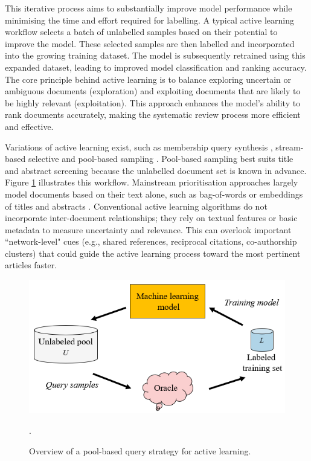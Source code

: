 \documentclass[10pt,oneside]{book}
\begin{document}
This iterative process aims to substantially improve model performance while minimising the time and effort required for labelling. A typical active learning workflow selects a batch of unlabelled samples based on their potential to improve the model. These selected samples are then labelled and incorporated into the growing training dataset. The model is subsequently retrained using this expanded dataset, leading to improved model classification and ranking accuracy. The core principle behind active learning is to balance exploring uncertain or ambiguous documents (exploration) and exploiting documents that are likely to be highly relevant (exploitation). This approach enhances the model's ability to rank documents accurately, making the systematic review process more efficient and effective.

Variations of active learning exist, such as membership query synthesis \cite{angluin_queries_1988}, stream-based selective \cite{akinseloyin_novel_2024} and pool-based sampling \cite{lewis_sequential_1994}. 
Pool-based sampling best suits title and abstract screening because the unlabelled document set is known in advance. Figure \ref{fig:pool_based_query} illustrates this workflow. Mainstream prioritisation approaches largely model documents based on their text alone, such as bag-of-words or embeddings of titles and abstracts \cite{diao_lexical_2021}. Conventional active learning algorithms do not incorporate inter-document relationships; they rely on textual features or basic metadata to measure uncertainty and relevance. This can overlook important ``network-level" cues (e.g., shared references, reciprocal citations, co-authorship clusters) that could guide the active learning process toward the most pertinent articles faster.


\begin{figure}
\centering
\includegraphics[width=0.5\linewidth]{Confirmation Review/images/pool_based_strategy.png}
\caption{Overview of a pool-based query strategy for active learning. \cite{ren_survey_2020}\protect\footnotemark}.
\label{fig:pool_based_query}
\end{figure}
\end{document}
